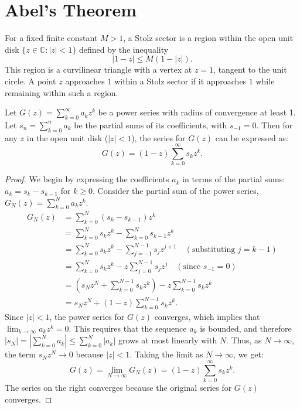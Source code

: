 
\chapter{Abel's Theorem}

\begin{definition}
    \label{def:Stolz_Sector}
    For a fixed finite constant $M > 1$, a Stolz sector is a region within the open unit disk $\{z \in \mathbb{C} : |z| < 1\}$ defined by the inequality
    \[
        |1-z| \leq M(1-|z|).
    \]
    This region is a curvilinear triangle with a vertex at $z=1$, tangent to the unit circle. A point $z$ approaches $1$ within a Stolz sector if it approaches $1$ while remaining within such a region.
\end{definition}

\begin{lemma}
    \label{lem:Summation_by_Parts}
    Let $G(z) = \sum_{k=0}^{\infty} a_k z^k$ be a power series with radius of convergence at least 1. Let $s_n = \sum_{k=0}^{n} a_k$ be the partial sums of its coefficients, with $s_{-1}=0$. Then for any $z$ in the open unit disk ($|z| < 1$), the series for $G(z)$ can be expressed as:
    \[
        G(z) = (1-z) \sum_{k=0}^{\infty} s_k z^k.
    \]
\end{lemma}

\begin{proof}
    We begin by expressing the coefficients $a_k$ in terms of the partial sums: $a_k = s_k - s_{k-1}$ for $k \geq 0$.
    Consider the partial sum of the power series, $G_N(z) = \sum_{k=0}^{N} a_k z^k$.
    \begin{align*}
        G_N(z) & = \sum_{k=0}^{N} (s_k - s_{k-1}) z^k \\
               & = \sum_{k=0}^{N} s_k z^k - \sum_{k=0}^{N} s_{k-1} z^k \\
               & = \sum_{k=0}^{N} s_k z^k - \sum_{j=-1}^{N-1} s_{j} z^{j+1} \quad (\text{substituting } j=k-1) \\
               & = \sum_{k=0}^{N} s_k z^k - z \sum_{j=0}^{N-1} s_{j} z^{j} \quad (\text{since } s_{-1}=0) \\
               & = (s_N z^N + \sum_{k=0}^{N-1} s_k z^k) - z \sum_{k=0}^{N-1} s_k z^k \\
               & = s_N z^N + (1-z) \sum_{k=0}^{N-1} s_k z^k.
    \end{align*}
    Since $|z| < 1$, the power series for $G(z)$ converges, which implies that $\lim_{k \to \infty} a_k z^k = 0$. This requires that the sequence $a_k$ is bounded, and therefore $|s_N| = |\sum_{k=0}^N a_k| \le \sum_{k=0}^N |a_k|$ grows at most linearly with $N$. Thus, as $N \to \infty$, the term $s_N z^N \to 0$ because $|z| < 1$.
    Taking the limit as $N \to \infty$, we get:
    \[
        G(z) = \lim_{N\to\infty} G_N(z) = (1-z) \sum_{k=0}^{\infty} s_k z^k.
    \]
    The series on the right converges because the original series for $G(z)$ converges.
\end{proof}

